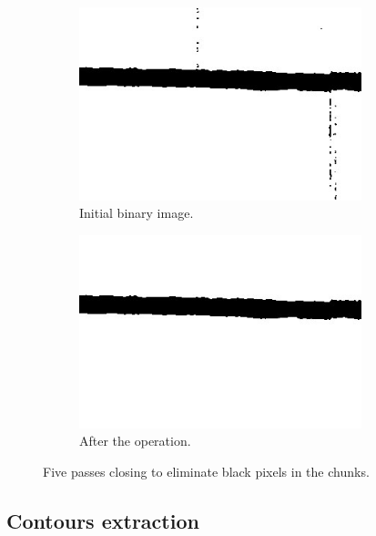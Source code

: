 \begin{figure}[!ht]
\centering
    \begin{subfigure}[t]{0.45\textwidth}
    \centering
    \includegraphics[width=0.9\textwidth]{images/morpho-before}
    \caption{Initial binary image.}
    \label{fig:morphobef}
    \end{subfigure}
    \begin{subfigure}[t]{0.45\textwidth}
    \centering
    \includegraphics[width=0.9\textwidth]{images/morpho-after}
    \caption{After the operation.}
    \label{fig:morphoaft}
    \end{subfigure}
    \caption{Five passes closing to eliminate black pixels in the chunks.}
    \label{fig:morphoex}
\end{figure}

\subsection{Contours extraction}
\label{sec:contextract}

